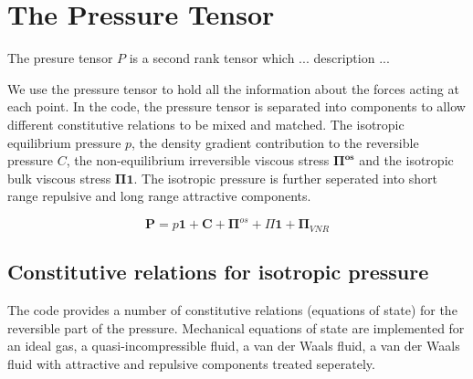 




\section{The Pressure Tensor}
The presure tensor $P$ is a second rank tensor which ... description ...

We use the pressure tensor to hold all the information about the forces acting
at each point. In the code, the pressure tensor is separated into components to
allow different constitutive relations to be mixed and matched. The isotropic
equilibrium pressure $p$, the density gradient contribution to the reversible
pressure $C$, the non-equilibrium irreversible viscous stress
$\mathbf{\Pi^{os}}$ and the isotropic bulk viscous stress
$\mathbf{\Pi\mathbold{1}}$. The isotropic pressure is further seperated into
short range repulsive and long range attractive components.

\begin{equation}
\label{pressure_tensor}
\mathbold{P} = p\mathbold{1} + \mathbold{C} +  \mathbold{\Pi}^{os} 
+ \Pi \mathbold{1}  + \mathbold{\Pi}_{VNR}
\end{equation}

\subsection{Constitutive relations for isotropic pressure}
The code provides a number of constitutive relations (equations of state) for
the reversible part of the pressure.  Mechanical equations of state are
implemented for an ideal gas, a quasi-incompressible fluid, a van der Waals
fluid, a van der Waals fluid with attractive and repulsive components treated
seperately.

